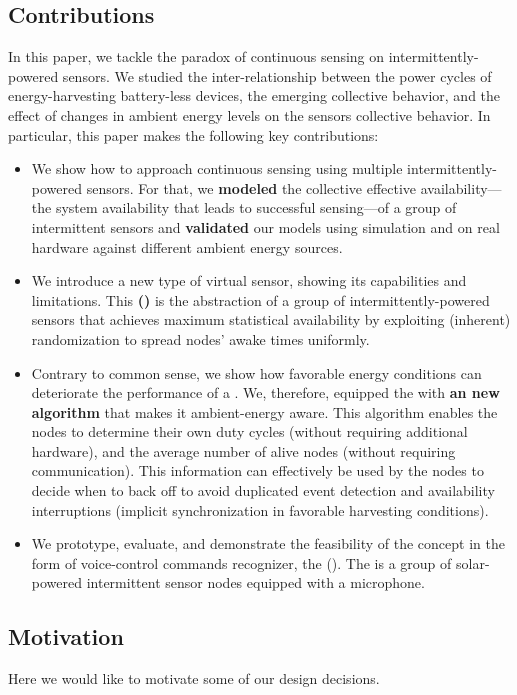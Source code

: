 \subsection{Contributions}
In this paper, we tackle the paradox of continuous sensing on intermittently-powered sensors. 
We studied the inter-relationship between the power cycles of energy-harvesting battery-less devices, the emerging collective behavior, and the effect of changes in ambient energy levels on the sensors collective behavior. In particular, this paper makes the following key contributions:
\begin{itemize}
%
\item We show how to approach continuous sensing using multiple intermittently-powered sensors. 
For that, we \textbf{modeled} the collective effective availability---the system availability that leads to successful sensing---of a group of intermittent sensors and \textbf{validated} our models using simulation and on real hardware against different ambient energy sources. 
%
\item We introduce a new type of virtual sensor, showing its capabilities and limitations. This \textbf{\fullsys (\sys)} is the abstraction of a group of intermittently-powered sensors that achieves maximum statistical availability by exploiting (inherent) randomization to spread nodes' awake times uniformly.
% 
\item Contrary to common sense, we show how favorable energy conditions can deteriorate the performance of a \sys. We, therefore, equipped the \sys with \textbf{an new algorithm} that makes it ambient-energy aware. This algorithm enables the nodes to determine their own duty cycles (without requiring additional hardware), and the average number of alive nodes (without requiring communication). This information can effectively be used by the nodes to decide when to back off to avoid duplicated event detection and availability interruptions (implicit synchronization in favorable harvesting conditions).
%
\item We prototype, evaluate, and demonstrate the feasibility of the \fullsys concept in the form of voice-control commands recognizer, the \textbf{\fullCIM} (\textbf{\cim}). The \cim is a group of solar-powered intermittent sensor nodes equipped with a microphone.
\end{itemize}


\subsection{Motivation}
Here we would like to motivate some of our design decisions.

